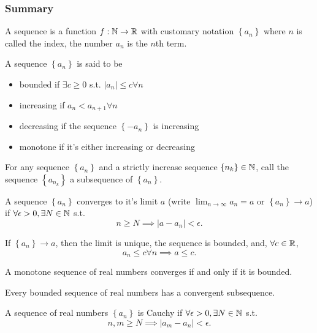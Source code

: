\newcommand{\seq}[1]{\left\{#1\right\}}
\newcommand{\abs}[1]{\left|#1\right|}

\subsubsection{Summary}

A sequence is a function $f:\mathbb{N} \to \mathbb{R}$ with customary notation $\seq{a_n}$ 
where $n$ is called the index, the number $a_n$ is the $n$th term.

A sequence $\seq{a_n}$ is said to be
\begin{itemize}
    \item bounded if $\exists c \geq 0$ s.t. $\abs{a_n} \leq c \forall n$ 
    \item increasing if $a_n < a_{n+1} \forall n$
    \item decreasing if the sequence $\seq{-a_n}$ is increasing
    \item monotone if it's either increasing or decreasing
\end{itemize}

For any sequence $\seq{a_n}$ and a strictly increase sequence $\seq{n_k} \in \N$,
call the sequence $\seq{a_{n_k}}$ a subsequence of $\seq{a_n}$.

\begin{defn}
    A sequence $\seq{a_n}$ converges to it's limit $a$ (write $\lim_{n \to \infty} a_n = a$ or $\seq{a_n}\to a$) if $\forall \epsilon > 0, \exists N \in \mathbb{N}$ s.t.
    \[ n\geq N \implies \abs{a - a_n} < \epsilon.\]
\end{defn}

\begin{prop}
    If $\seq{a_n}\to a$, then the limit is unique, the sequence is bounded, and, $\forall c \in \mathbb{R}$, 
    \[ a_n \leq c \forall n \implies a \leq c.\]
\end{prop}

\begin{thm}
    A monotone sequence of real numbers converges if and only if it is bounded.
\end{thm}
\begin{thm}
    Every bounded sequence of real numbers has a convergent subsequence.
\end{thm}
\begin{defn}
    A sequence of real numbers $\seq{a_n}$ is Cauchy if $\forall \epsilon > 0, \exists N\in\mathbb{N}$ s.t.
    \[ n, m \geq N \implies \abs{a_m - a_n} < \epsilon.\]
\end{defn}

